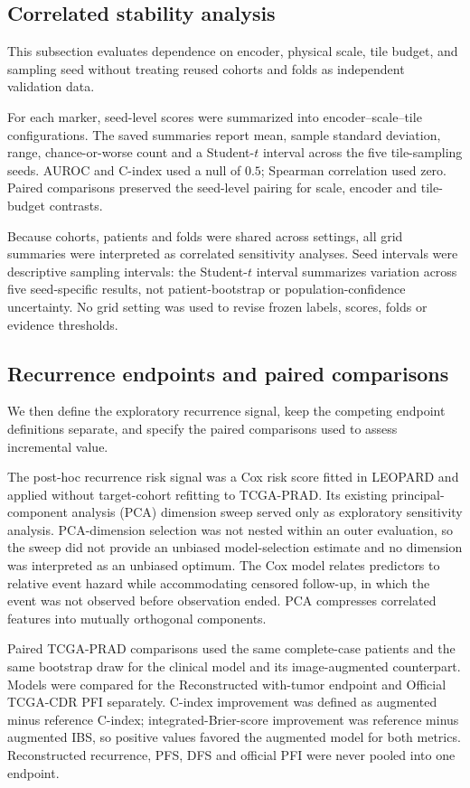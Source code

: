 \subsection{Correlated stability analysis}

This subsection evaluates dependence on encoder, physical scale, tile budget, and sampling
seed without treating reused cohorts and folds as independent validation data.

For each marker, seed-level scores were summarized into encoder--scale--tile configurations.
The saved summaries report mean, sample standard deviation, range, chance-or-worse count and
a Student-$t$ interval across the five tile-sampling seeds. AUROC and C-index used a null of
$0.5$; Spearman correlation used zero. Paired comparisons preserved the seed-level pairing
for scale, encoder and tile-budget contrasts.

Because cohorts, patients and folds were shared across settings, all grid summaries were
interpreted as correlated sensitivity analyses. Seed intervals were descriptive sampling
intervals: the Student-$t$ interval summarizes variation across five seed-specific results,
not patient-bootstrap or population-confidence uncertainty. No grid setting was
used to revise frozen labels, scores, folds or evidence thresholds.

\subsection{Recurrence endpoints and paired comparisons}

We then define the exploratory recurrence signal, keep the competing endpoint definitions
separate, and specify the paired comparisons used to assess incremental value.

The post-hoc recurrence risk signal was a Cox risk score fitted in LEOPARD and applied
without target-cohort refitting to TCGA-PRAD. Its existing principal-component analysis
(PCA) dimension sweep served only as exploratory sensitivity analysis. PCA-dimension
selection was not nested within an outer evaluation,
so the sweep did not provide an unbiased model-selection estimate and no dimension was
interpreted as an unbiased optimum.
The Cox model relates predictors to relative event hazard while accommodating censored
follow-up, in which the event was not observed before observation ended. PCA compresses
correlated features into mutually orthogonal components.

Paired TCGA-PRAD comparisons used the same complete-case patients and the same bootstrap
draw for the clinical model and its image-augmented counterpart. Models were compared for
the Reconstructed with-tumor endpoint and Official TCGA-CDR PFI separately. C-index
improvement was defined as augmented minus reference C-index; integrated-Brier-score
improvement was reference minus augmented IBS, so positive values favored the augmented
model for both metrics. Reconstructed recurrence, PFS, DFS and official PFI were never
pooled into one endpoint.

